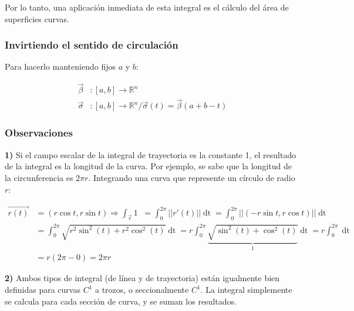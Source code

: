 \documentclass{article}
\renewcommand{\Bbb}{\mathbb}
\begin{document}
Por lo tanto, una aplicación inmediata de esta integral es el cálculo del área de superficies curvas.

\subsubsection{Invirtiendo el sentido de circulación}

Para hacerlo manteniendo fijos $a$ y $b$:

\begin{subequations}
\begin{align}
\overrightarrow{\beta} &: [a, b] \rightarrow \Bbb R^n \\
\overrightarrow{\sigma} &: [a, b] \rightarrow \Bbb R^n / \overrightarrow{\sigma}(t) = \overrightarrow{\beta}(a + b - t) 
\end{align}
\end{subequations}

\subsubsection{Observaciones}

\textbf{1)} Si el campo escalar de la integral de trayectoria es la constante 1, el resultado de la integral es la longitud de la curva. Por ejemplo, se sabe que la longitud de la circunferencia es $2 \pi r$. Integrando una curva que represente un círculo de radio $r$:

\begin{subequations}
\begin{align}
\overrightarrow{r(t)} &= (r \cos t, r \sin t) \Rightarrow \int_{\overrightarrow{r}} 1 \mathop{\overrightarrow{dr}} = \int_{0}^{2 \pi} ||r'(t)|| \mathop{dt} = \int_{0}^{2 \pi} ||(-r \sin t, r \cos t)|| \mathop{dt} \\
&= \int_{0}^{2 \pi} \sqrt{r^2 \sin^2 (t) + r^2 \cos^2 (t)} \mathop{dt} = r \int_{0}^{2 \pi} \underbrace{ \sqrt{\sin^2(t) + \cos^2(t)} }_{1} \mathop{dt} = r \int_{0}^{2 \pi} \mathop{dt} \\
&= r (2 \pi - 0) = 2 \pi r
\end{align}
\end{subequations}

\textbf{2)} Ambos tipos de integral (de línea y de trayectoria) están igualmente bien definidas para curvas $C^1$ a trozos, o seccionalmente $C^1$. La integral simplemente se calcula para cada sección de curva, y se suman los resultados.
\end{document}
